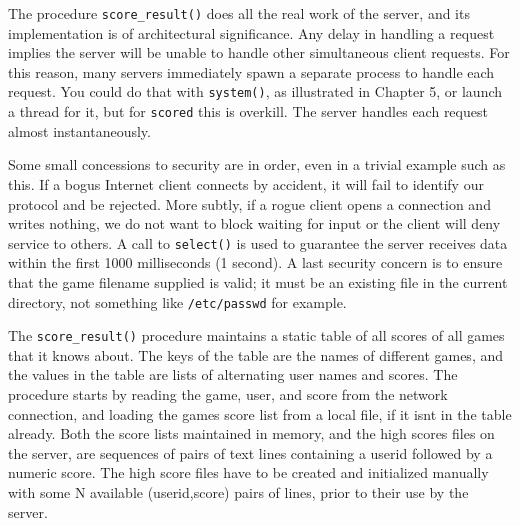 The procedure \texttt{score\_result()} does all the real work of the
server, and its implementation is of architectural significance. Any
delay in handling a request implies the server will be unable to
handle other simultaneous client requests. For this reason, many servers
immediately spawn a separate process to handle each request.
You could do that with \texttt{system()}, as illustrated in Chapter 5,
or launch a thread for it,
but for \texttt{scored} this is overkill. The server handles each
request almost instantaneously.

Some small concessions to security are in order, even in a trivial
example such as this. If a bogus Internet client connects by accident,
it will fail to identify our protocol and be rejected. More subtly, if
a rogue client opens a connection and writes nothing, we do not want to
block waiting for input or the client will deny service to others. A
call to \texttt{select()} is used to guarantee the server receives data within
the first 1000 milliseconds (1 second). A last security concern is to
ensure that the {\textquotedbl}game{\textquotedbl} filename supplied is
valid; it must be an existing file in the current directory, not
something like \texttt{/etc/passwd} for example. 

The \texttt{score\_result()} procedure maintains a static table of all
scores of all games that it knows about. The keys of the table are the
names of different games, and the values in the table are lists of
alternating user names and scores. The procedure starts by reading the
game, user, and score from the network connection, and loading the
game{\textquotesingle}s score list from a local file, if it
isn{\textquotesingle}t in the table already. Both the score lists
maintained in memory, and the high scores files on the server, are
sequences of pairs of text lines containing a userid followed by a
numeric score. The high score files have to be created and initialized
manually with some N available (userid,score) pairs of lines, prior to
their use by the server.

